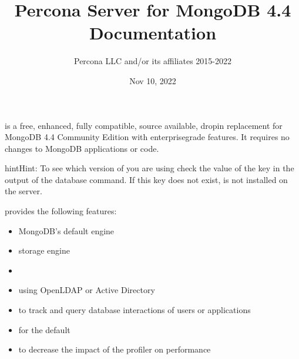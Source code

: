 \documentclass[letterpaper,10pt,english]{sphinxmanual}
\title{Percona Server for MongoDB 4.4 Documentation}
\date{Nov 10, 2022}
\author{Percona LLC and/or its affiliates 2015-2022}
\begin{document}
\pagestyle{empty}
\sphinxmaketitle
\pagestyle{plain}
\sphinxtableofcontents
\pagestyle{normal}
\label{\detokenize{index::doc}}


\sphinxAtStartPar
{} is a free, enhanced, fully compatible, source available, drop\sphinxhyphen{}in replacement
for MongoDB 4.4 Community Edition with enterprise\sphinxhyphen{}grade features.
It requires no changes to MongoDB applications or code.

\begin{sphinxadmonition}{hint}{Hint:}
\sphinxAtStartPar
To see which version of  you are using check the value of the
 key in the output of the  database command. If
this key does not exist,  is not installed on the server.
\end{sphinxadmonition}

\sphinxAtStartPar
{} provides the following features:
\begin{itemize}
\item {} 
\sphinxAtStartPar
MongoDB’s default  engine

\item {} 
\sphinxAtStartPar
{\hyperref[\detokenize{inmemory:inmemory}]{}} storage engine

\item {} 
\sphinxAtStartPar
{\hyperref[\detokenize{data-at-rest-encryption:psmdb-data-at-rest-encryption}]{}}

\item {} 
\sphinxAtStartPar
{\hyperref[\detokenize{authentication:ext-auth}]{}}
using OpenLDAP or Active Directory

\item {} 
\sphinxAtStartPar
{\hyperref[\detokenize{audit-logging:audit-log}]{}}
to track and query database interactions of users or applications

\item {} 
\sphinxAtStartPar
{\hyperref[\detokenize{hot-backup:hot-backup}]{}} for the default 

\item {} 
\sphinxAtStartPar
{\hyperref[\detokenize{rate-limit:rate-limit}]{}} to decrease the impact of the profiler on performance

\end{itemize}
\end{document}
